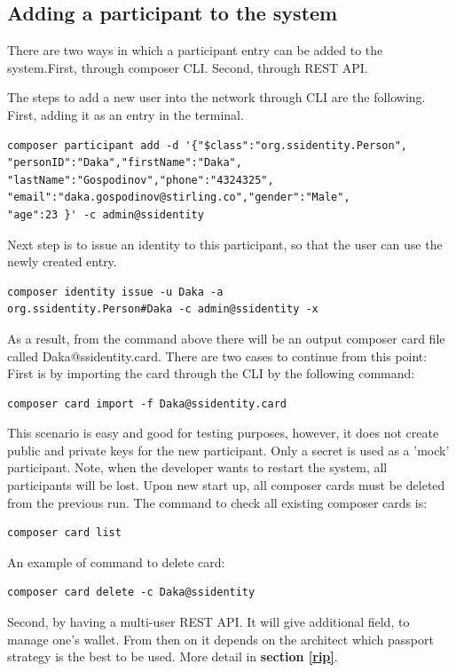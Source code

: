 \documentclass[a4paper,11pt]{report}
\begin{document}
\subsection{Adding a participant to the system}
There are two ways in which a participant entry can be added to the system.First, through composer CLI. Second, through REST API. 

The steps to add a new user into the network through CLI are the following. First, adding it as an entry in the terminal. 
\begin{verbatim}
composer participant add -d '{"$class":"org.ssidentity.Person",
"personID":"Daka","firstName":"Daka",
"lastName":"Gospodinov","phone":"4324325",
"email":"daka.gospodinov@stirling.co","gender":"Male",
"age":23 }' -c admin@ssidentity
\end{verbatim}	

Next step is to issue an identity to this participant, so that the user can use the newly created entry. 

\begin{verbatim}
composer identity issue -u Daka -a 
org.ssidentity.Person#Daka -c admin@ssidentity -x
\end{verbatim}

As a result, from the command above there will be an output composer card file called Daka@ssidentity.card. There are two cases to continue from this point: 
First is by importing the card through the CLI by the following command: 
\begin{verbatim}
composer card import -f Daka@ssidentity.card
\end{verbatim}
This scenario is easy and good for testing purposes, however, it does not create public and private keys for the new participant. Only a secret is used as a 'mock' participant. Note, when the developer wants to restart the system, all participants will be lost. Upon new start up, all composer cards must be deleted from the previous run. The command to check all existing composer cards is: 
\begin{verbatim}
composer card list
\end{verbatim}
An example of command to delete card: 
\begin{verbatim}
composer card delete -c Daka@ssidentity
\end{verbatim}

Second, by having a multi-user REST API. It will give additional field, to manage one's wallet. From then on it depends on the architect which passport strategy is the best to be used. More detail in \textbf{section \ref{rip}}.
\end{document}
